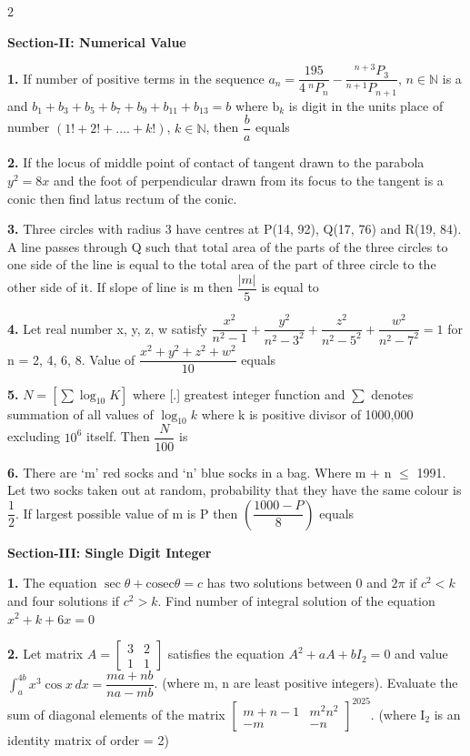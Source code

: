 \documentclass[10pt]{extarticle}
\newcommand{\subsectionhdr}[1]{\par\vspace{3pt}\noindent\textbf{#1}\par\vspace{2pt}}
\begin{document}
\begin{multicols}{2}
\subsectionhdr{Section-II: Numerical Value}

\textbf{1.} If number of positive terms in the sequence $a_n=\dfrac{195}{4\ ^nP_n}-\dfrac{^{n+3}P_3}{^{n+1}P_{n+1}}$, $n\in\mathbb N$ is a and $b_1+b_3+b_5+b_7+b_9+b_{11}+b_{13}=b$ where b$_k$ is digit in the units place of number $(1!+2!+\ldots.+k!)$, $k\in\mathbb N$, then $\dfrac ba$ equals

\textbf{2.} If the locus of middle point of contact of tangent drawn to the parabola $y^2=8x$ and the foot of perpendicular drawn from its focus to the tangent is a conic then find latus rectum of the conic.

\textbf{3.} Three circles with radius 3 have centres at P(14, 92), Q(17, 76) and R(19, 84). A line passes through Q such that total area of the parts of the three circles to one side of the line is equal to the total area of the part of three circle to the other side of it. If slope of line is m then $\dfrac{|m|}5$ is equal to

\textbf{4.} Let real number x, y, z, w satisfy $\dfrac{x^2}{n^2-1}+\dfrac{y^2}{n^2-3^2}+\dfrac{z^2}{n^2-5^2}+\dfrac{w^2}{n^2-7^2}=1$ for n = 2, 4, 6, 8. Value of $\dfrac{x^2+y^2+z^2+w^2}{10}$ equals

\textbf{5.} $N=\left[\displaystyle\sum\log_{10}K\right]$ where [.] greatest integer function and $\sum$ denotes summation of all values of $\log_{10}k$ where k is positive divisor of 1000,000 excluding $10^6$ itself. Then $\dfrac N{100}$ is

\textbf{6.} There are `m' red socks and `n' blue socks in a bag. Where m + n $\le$ 1991. Let two socks taken out at random, probability that they have the same colour is $\dfrac12$. If largest possible value of m is P then $\left(\dfrac{1000-P}8\right)$ equals

\subsectionhdr{Section-III: Single Digit Integer}

\textbf{1.} The equation $\sec\theta+\text{cosec}\theta=c$ has two solutions between 0 and $2\pi$ if $c^2<k$ and four solutions if $c^2>k$. Find number of integral solution of the equation $x^2+k+6x=0$

\textbf{2.} Let matrix $A=\begin{bmatrix}3&2\\1&1\end{bmatrix}$ satisfies the equation $A^2+aA+bI_2=0$ and value $\displaystyle\int_a^{4b}x^3\cos x\,dx=\dfrac{ma+nb}{na-mb}$. (where m, n are least positive integers). Evaluate the sum of diagonal elements of the matrix $\begin{bmatrix}m+n-1&m^2n^2\\-m&-n\end{bmatrix}^{2025}$. (where I$_2$ is an identity matrix of order = 2)


\end{multicols}
\end{document}
